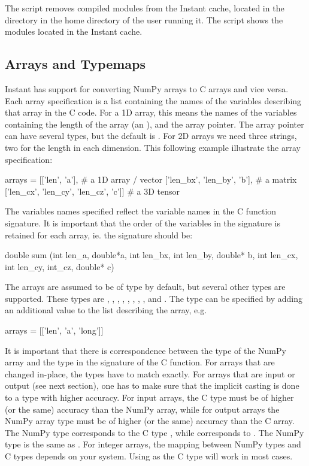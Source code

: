 The script  removes
compiled modules from the Instant cache, located in the directory
 in the home directory of the user running it. 
The script  shows the modules located in the
Instant cache.

\subsection{Arrays and Typemaps}\label{wilbers:sec:arrays}
Instant has support for converting NumPy arrays to C arrays and vice
versa. Each array specification is a list containing the names
of the variables describing that array in the C code. For a 1D
array, this means the names of the variables containing the length of the
array (an ), and the array pointer. The array pointer 
can have several types, but the default is . For 2D arrays we need three strings, two
for the length in each dimension. This following example illustrate the array specification:
\begin{python}
arrays = [['len', 'a'],                        # a 1D array / vector  
          ['len_bx', 'len_by', 'b'],           # a matrix 
          ['len_cx', 'len_cy', 'len_cz', 'c']] # a 3D tensor 
\end{python}
The variables names specified reflect the variable names in the C function
signature. It is important that the order of the variables in the signature is
retained for each array, ie. the signature should be:  
\begin{python}
double sum (int len_a, double*a,  
	          int len_bx, int len_by, double* b,
	          int len_cx, int len_cy, int_cz, double* c)
\end{python}
The arrays are assumed to be of type  by default, but several other
types are supported. These types 
are , , , , , , , ,
and . The type can be specified by adding an
additional value to the list describing the array, e.g.
\begin{python}
arrays = [['len', 'a', 'long']]
\end{python}
It is important that there is correspondence between the type of the NumPy
array and the type in the signature of the C function. For arrays that are
changed in-place, the types have to match exactly. For arrays that are input or
output (see next section), one has to make sure that the implicit casting is done to a type with
higher accuracy. For input arrays, the C type must be of higher (or the
same) accuracy than the NumPy array, while for output arrays the NumPy array
type must be of higher (or the same) accuracy than the C array. The NumPy
type  corresponds to the C type , while 
corresponds to . The NumPy type  is the same
as . For integer arrays, the mapping
between NumPy types and C types depends on your system. Using  as
the C type will work in most cases.

